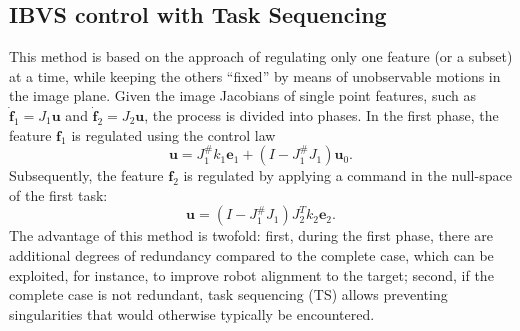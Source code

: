 \documentclass[10pt, a4paper]{report}
\begin{document}
\subsection{IBVS control with Task Sequencing}
This method is based on the approach of regulating only one feature (or a subset) at a time, while keeping the others ``fixed'' by means of unobservable motions in the image plane. Given the image Jacobians of single point features, such as $\dot{\mathbf f}_1 = J_1\mathbf u$ and $\dot{\mathbf f}_2 = J_2\mathbf u$, the process is divided into phases. In the first phase, the feature $\mathbf f_1$ is regulated using the control law $$\mathbf u = J_1^\# k_1 \mathbf e_1 + (I - J_1^\# J_1)\mathbf u_0.$$
Subsequently, the feature $\mathbf f_2$ is regulated by applying a command in the null-space of the first task: $$\mathbf u = (I - J_1^\# J_1) J_2^T k_2\mathbf e_2.$$
The advantage of this method is twofold: first, during the first phase, there are additional degrees of redundancy compared to the complete case, which can be exploited, for instance, to improve robot alignment to the target; second, if the complete case is not redundant, task sequencing (TS) allows preventing singularities that would otherwise typically be encountered.
\end{document}

